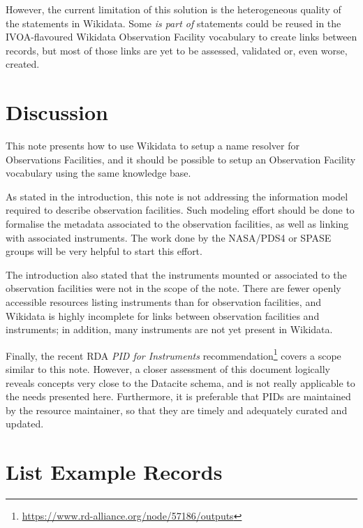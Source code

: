 \documentclass[11pt,a4paper]{ivoa}
\begin{document}
However, the current limitation of this solution is the heterogeneous 
quality of the statements in Wikidata. Some \emph{is part of} 
statements could be reused in the IVOA-flavoured Wikidata 
Observation Facility vocabulary to create links between 
records, but most of those links are yet to be assessed, validated
or, even worse, created.  

\section{Discussion}
This note presents how to use Wikidata to setup a name resolver 
for Observations Facilities, and it should be possible to setup 
an Observation Facility vocabulary using the same knowledge base.

As stated in the introduction, this note is not addressing the 
information model required to describe observation facilities. 
Such modeling effort should be done to formalise the metadata 
associated to the observation facilities, as well as linking 
with associated instruments. The work done by the NASA/PDS4 or
SPASE groups will be very helpful to start this effort. 

The introduction also stated that the instruments mounted or 
associated to the observation facilities were not in the scope
of the note. There are fewer openly accessible resources
listing instruments than for observation facilities, and 
Wikidata is highly incomplete for links between observation facilities
and instruments; in addition, many instruments
are not yet present in Wikidata.

Finally, the recent RDA \emph{PID for Instruments} 
recommendation\footnote{\url{https://www.rd-alliance.org/node/57186/outputs}} 
covers a scope similar to this note. However, a closer 
assessment of this document logically reveals concepts very 
close to the Datacite schema, and is not really applicable to 
the needs presented here. Furthermore, it is preferable that 
PIDs are maintained by the resource maintainer, so that they 
are timely and adequately curated and updated. 

\appendix
\section{List Example Records}
\end{document}
